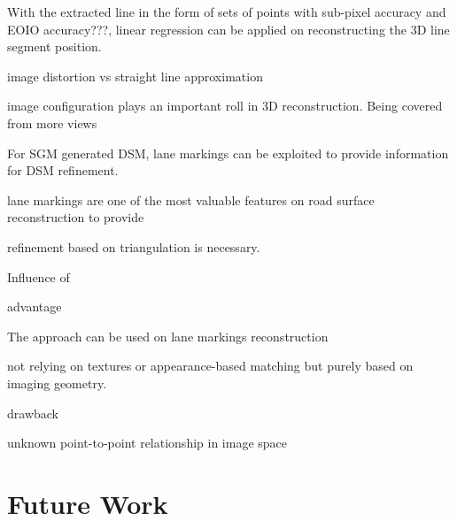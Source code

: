 With the extracted line in the form of sets of points with sub-pixel accuracy and EOIO accuracy???, linear regression can be applied on reconstructing the 3D line segment position.

image distortion vs straight line approximation


image configuration plays an important roll in 3D reconstruction. Being covered from more views



For SGM generated DSM, lane markings can be exploited to provide information for DSM refinement. 

lane markings are one of the most valuable features on road surface reconstruction to provide 

 refinement based on triangulation is necessary.



Influence of 


advantage

The approach can be used on lane markings reconstruction

not relying on textures or appearance-based matching
but purely based on imaging geometry.

drawback

unknown point-to-point relationship in image space




\section*{Future Work}
\label{chap:futurework}




